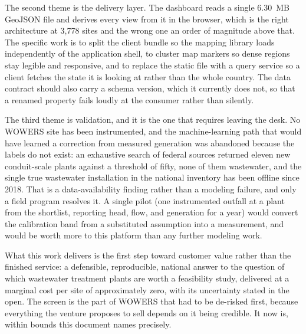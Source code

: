 \documentclass[12pt,letterpaper]{report}
\begin{document}
The second theme is the delivery layer. The dashboard reads a single 6.30~MB
GeoJSON file and derives every view from it in the browser, which is the right
architecture at 3{,}778 sites and the wrong one an order of magnitude above that.
The specific work is to split the client bundle so the mapping library loads
independently of the application shell, to cluster map markers so dense regions
stay legible and responsive, and to replace the static file with a query service
so a client fetches the state it is looking at rather than the whole country. The
data contract should also carry a schema version, which it currently does not, so
that a renamed property fails loudly at the consumer rather than silently.

The third theme is validation, and it is the one that requires leaving the desk.
No WOWERS site has been instrumented, and the machine-learning path that would
have learned a correction from measured generation was abandoned because the
labels do not exist: an exhaustive search of federal sources returned eleven new
conduit-scale plants against a threshold of fifty, none of them wastewater, and
the single true wastewater installation in the national inventory has been offline
since 2018. That is a data-availability finding rather than a modeling failure,
and only a field program resolves it. A single pilot (one instrumented
outfall at a plant from the shortlist, reporting head, flow, and generation for a
year) would convert the calibration band from a substituted assumption into a
measurement, and would be worth more to this platform than any further modeling
work.

What this work delivers is the first step toward customer value rather than the
finished service: a defensible, reproducible, national answer to the question of
which wastewater treatment plants are worth a feasibility study, delivered at a
marginal cost per site of approximately zero, with its uncertainty stated in the
open. The screen is the part of WOWERS that had to be de-risked first, because
everything the venture proposes to sell depends on it being credible. It now is,
within bounds this document names precisely.
\end{document}
